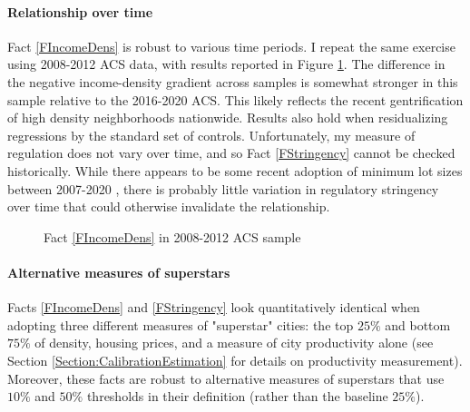 \documentclass[12pt]{article}
\begin{document}
	
	\paragraph*{Relationship over time} Fact \ref{FIncomeDens} is robust to various time periods. I repeat the same exercise using 2008-2012 ACS data, with results reported in Figure \ref{figure:incSort_hist}. The difference in the negative income-density gradient across samples is somewhat stronger in this sample relative to the 2016-2020 ACS. This likely reflects the recent gentrification of high density neighborhoods nationwide. Results also hold when residualizing regressions by the standard set of controls. Unfortunately, my measure of regulation does not vary over time, and so Fact \ref{FStringency} cannot be checked historically. While there appears to be some recent adoption of minimum lot sizes between 2007-2020 \citep{gyourko2021},  there is probably little variation in regulatory stringency over time that could otherwise invalidate the relationship. 
	
	\begin{figure}[htbp!]
		\caption{Fact \ref{FIncomeDens} in 2008-2012 ACS sample}\label{figure:incSort_hist}
		
	\end{figure}
	
	\paragraph*{Alternative measures of superstars} Facts \ref{FIncomeDens} and \ref{FStringency} look quantitatively identical when adopting three different measures of "superstar" cities: the top $25\%$  and bottom  $75\%$ of density, housing prices, and a measure of city productivity alone (see Section \ref{Section:CalibrationEstimation} for details on productivity measurement). Moreover, these facts are robust to alternative measures of superstars that use $10 \%$ and $50 \%$ thresholds in their definition (rather than the baseline $25\%$).  
	
\end{document}
